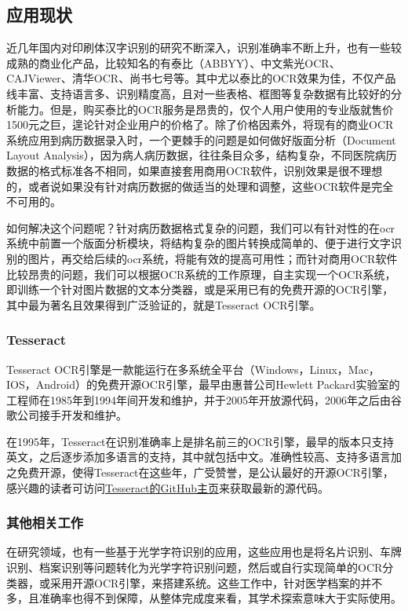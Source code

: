 \subsection{应用现状}
近几年国内对印刷体汉字识别的研究不断深入，识别准确率不断上升，也有一些较成熟的商业化产品，比较知名的有泰比（ABBYY）、中文紫光OCR、CAJViewer、清华OCR、尚书七号等。其中尤以泰比的OCR效果为佳，不仅产品线丰富、支持语言多、识别精度高，且对一些表格、框图等复杂数据有比较好的分析能力。但是，购买泰比的OCR服务是昂贵的，仅个人用户使用的专业版就售价1500元之巨，遑论针对企业用户的价格了。除了价格因素外，将现有的商业OCR系统应用到病历数据录入时，一个更棘手的问题是如何做好版面分析（Document Layout Analysis），因为病人病历数据，往往条目众多，结构复杂，不同医院病历数据的格式标准各不相同，如果直接套用商用OCR软件，识别效果是很不理想的，或者说如果没有针对病历数据的做适当的处理和调整，这些OCR软件是完全不可用的。

如何解决这个问题呢？针对病历数据格式复杂的问题，我们可以有针对性的在ocr系统中前置一个版面分析模块，将结构复杂的图片转换成简单的、便于进行文字识别的图片，再交给后续的ocr系统，将能有效的提高可用性；而针对商用OCR软件比较昂贵的问题，我们可以根据OCR系统的工作原理，自主实现一个OCR系统，即训练一个针对图片数据的文本分类器，或是采用已有的免费开源的OCR引擎，其中最为著名且效果得到广泛验证的，就是Tesseract OCR引擎。

\subsubsection*{Tesseract}
Tesseract OCR引擎是一款能运行在多系统全平台（Windows，Linux，Mac，IOS，Android）的免费开源OCR引擎，最早由惠普公司Hewlett Packard实验室的工程师在1985年到1994年间开发和维护，并于2005年开放源代码，2006年之后由谷歌公司接手开发和维护\citep{wiki:Tesseract}。

在1995年，Tesseract在识别准确率上是排名前三的OCR引擎，最早的版本只支持英文，之后逐步添加多语言的支持，其中就包括中文。准确性较高、支持多语言加之免费开源，使得Tesseract在这些年，广受赞誉，是公认最好的开源OCR引擎，感兴趣的读者可访问\href{https://github.com/tesseract-ocr/tesseract}{Tesseract的GitHub主页}来获取最新的源代码。

\subsubsection*{其他相关工作}
在研究领域，也有一些基于光学字符识别的应用\citep{SongWan, HongfengLi, TikunHu}，这些应用也是将名片识别、车牌识别、档案识别等问题转化为光学字符识别问题，然后或自行实现简单的OCR分类器，或采用开源OCR引擎，来搭建系统。这些工作中，针对医学档案的并不多\citep{MinghuaXiang}，且准确率也得不到保障，从整体完成度来看，其学术探索意味大于实际使用。

